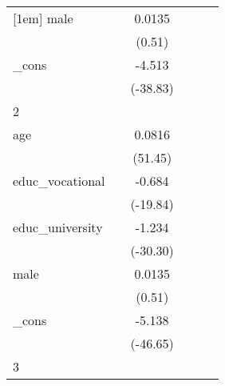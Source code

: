 {\begin{tabular}{l*{5}{c}}
[1em]
male        &                     &      0.0135         &                     &                     &                     \\
            &                     &      (0.51)         &                     &                     &                     \\
[1em]
\_cons      &                     &      -4.513\sym{***}&                     &                     &                     \\
            &                     &    (-38.83)         &                     &                     &                     \\
\hline
2           &                     &                     &                     &                     &                     \\
age         &                     &      0.0816\sym{***}&                     &                     &                     \\
            &                     &     (51.45)         &                     &                     &                     \\
[1em]
educ\_vocational&                     &      -0.684\sym{***}&                     &                     &                     \\
            &                     &    (-19.84)         &                     &                     &                     \\
[1em]
educ\_university&                     &      -1.234\sym{***}&                     &                     &                     \\
            &                     &    (-30.30)         &                     &                     &                     \\
[1em]
male        &                     &      0.0135         &                     &                     &                     \\
            &                     &      (0.51)         &                     &                     &                     \\
[1em]
\_cons      &                     &      -5.138\sym{***}&                     &                     &                     \\
            &                     &    (-46.65)         &                     &                     &                     \\
\hline
3           &                     &                     &                     &                     &                     \\

\end{tabular}}
